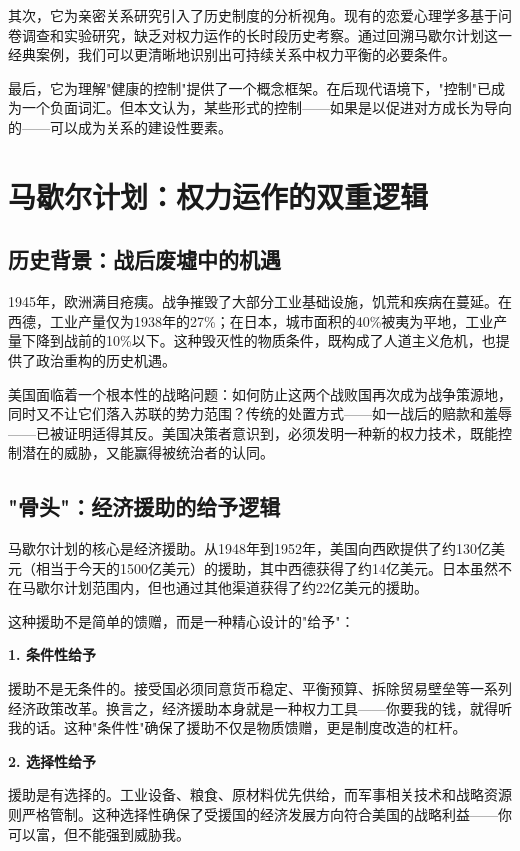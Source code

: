 \documentclass[12pt,a4paper]{article}
\begin{document}
其次，它为亲密关系研究引入了历史制度的分析视角。现有的恋爱心理学多基于问卷调查和实验研究，缺乏对权力运作的长时段历史考察。通过回溯马歇尔计划这一经典案例，我们可以更清晰地识别出可持续关系中权力平衡的必要条件。

最后，它为理解"健康的控制"提供了一个概念框架。在后现代语境下，"控制"已成为一个负面词汇。但本文认为，某些形式的控制——如果是以促进对方成长为导向的——可以成为关系的建设性要素。

\section{马歇尔计划：权力运作的双重逻辑}

\subsection{历史背景：战后废墟中的机遇}

1945年，欧洲满目疮痍。战争摧毁了大部分工业基础设施，饥荒和疾病在蔓延。在西德，工业产量仅为1938年的27\%；在日本，城市面积的40\%被夷为平地，工业产量下降到战前的10\%以下。这种毁灭性的物质条件，既构成了人道主义危机，也提供了政治重构的历史机遇。

美国面临着一个根本性的战略问题：如何防止这两个战败国再次成为战争策源地，同时又不让它们落入苏联的势力范围？传统的处置方式——如一战后的赔款和羞辱——已被证明适得其反。美国决策者意识到，必须发明一种新的权力技术，既能控制潜在的威胁，又能赢得被统治者的认同。

\subsection{"骨头"：经济援助的给予逻辑}

马歇尔计划的核心是经济援助。从1948年到1952年，美国向西欧提供了约130亿美元（相当于今天的1500亿美元）的援助，其中西德获得了约14亿美元。日本虽然不在马歇尔计划范围内，但也通过其他渠道获得了约22亿美元的援助。

这种援助不是简单的馈赠，而是一种精心设计的"给予"：

\textbf{1. 条件性给予}

援助不是无条件的。接受国必须同意货币稳定、平衡预算、拆除贸易壁垒等一系列经济政策改革。换言之，经济援助本身就是一种权力工具——你要我的钱，就得听我的话。这种"条件性"确保了援助不仅是物质馈赠，更是制度改造的杠杆。

\textbf{2. 选择性给予}

援助是有选择的。工业设备、粮食、原材料优先供给，而军事相关技术和战略资源则严格管制。这种选择性确保了受援国的经济发展方向符合美国的战略利益——你可以富，但不能强到威胁我。
\end{document}
